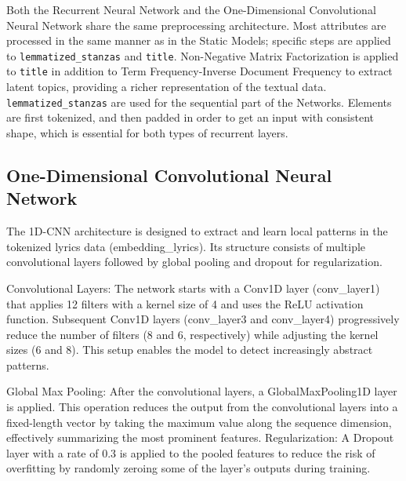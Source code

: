 
Both the Recurrent Neural Network and the One-Dimensional Convolutional
Neural Network share the same preprocessing
architecture. Most attributes are processed in the same manner as in
the Static Models; specific steps are applied to \texttt{lemmatized\_stanzas}
and \texttt{title}.
Non-Negative Matrix Factorization is applied to \texttt{title} in addition to
Term Frequency-Inverse Document Frequency
to extract latent topics, providing a richer representation of the
textual data.\\

\texttt{lemmatized\_stanzas} are used for the sequential part of the Networks.
Elements are first tokenized, and then padded in order to
get an input with consistent shape, which is essential for both types of
recurrent layers.\\

\subsection*{One-Dimensional Convolutional Neural Network}

The 1D-CNN architecture is designed to extract and learn local patterns in
the tokenized lyrics data (embedding\_lyrics). Its structure consists of
multiple convolutional layers followed by global pooling and dropout for
regularization.

Convolutional Layers:
The network starts with a Conv1D layer (conv\_layer1) that applies 12 filters
with a kernel size of 4 and uses the ReLU activation function.
Subsequent Conv1D layers (conv\_layer3 and conv\_layer4) progressively reduce
the number of filters (8 and 6, respectively) while adjusting the kernel sizes
(6 and 8). This setup enables the model to detect increasingly abstract
patterns.

Global Max Pooling:
After the convolutional layers, a GlobalMaxPooling1D layer is applied. This operation reduces the output from the convolutional layers into a fixed-length vector by taking the maximum value along the sequence dimension, effectively summarizing the most prominent features.
Regularization:
A Dropout layer with a rate of 0.3 is applied to the pooled features to reduce
the risk of overfitting by randomly zeroing some of the layer's outputs during
training.



